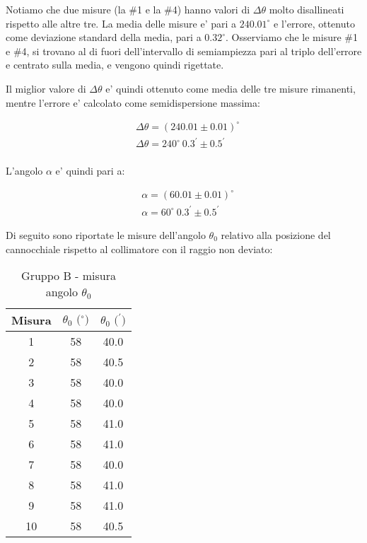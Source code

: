 Notiamo che due misure (la \#1 e la \#4) hanno valori di $\Delta \theta$ molto disallineati rispetto alle altre tre.
La media delle misure e' pari a $240.01^{\circ}$ e l'errore, ottenuto come deviazione standard della media, pari a $0.32^{\circ}$.
Osserviamo che le misure \#1 e \#4, si trovano al di fuori dell'intervallo di semiampiezza pari al triplo dell'errore e centrato sulla media, e vengono quindi rigettate.

Il miglior valore di $\Delta \theta$ e' quindi ottenuto come media delle tre misure rimanenti, mentre l'errore e' calcolato come semidispersione massima:

    \begin{align*}
        &\Delta \theta = (240.01 \pm 0.01)^{\circ} \\
        &\Delta \theta = 240^{\circ}\ 0.3^{\prime} \pm 0.5^{\prime} \\
    \end{align*}


L'angolo $\alpha$ e' quindi pari a:

    \begin{align*}
        &\alpha = (60.01 \pm 0.01)^{\circ} \\
        &\alpha = 60^{\circ} \ 0.3^{\prime} \pm 0.5^{\prime}
    \end{align*}


Di seguito sono riportate le misure dell'angolo $\theta_0$ relativo alla posizione del cannocchiale rispetto al collimatore con il raggio non deviato:
\begin{table}[!htbp]
    {\par\centering
    \begin{tabular}{ccc}
        \hline
        Misura & $\theta_0 \text{ ($^{\circ}$)}$ & $\theta_0 \text{ ($^{\prime}$)}$ \\
        \hline
        1   &   58 &   40.0\\
        2   &   58 &   40.5\\
        3   &   58 &   40.0\\
        4   &   58 &   40.0\\
        5   &   58 &   41.0\\
        6   &   58 &   41.0\\
        7   &   58 &   40.0\\
        8   &   58 &   41.0\\
        9   &   58 &   41.0\\
        10  &   58 &   40.5\\
        \hline
    \end{tabular}
    \par}
    \caption{Gruppo B - misura angolo $\theta_0$}
\end{table}

